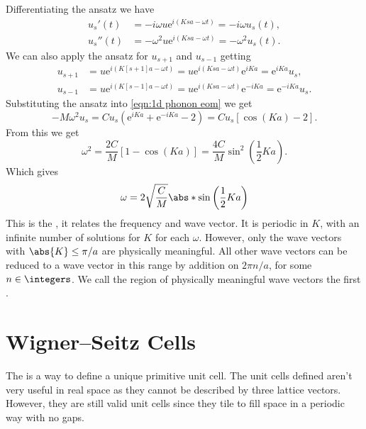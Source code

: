 \documentclass[fleqn]{NotesClass}
\newcommand*{\e}{\mathrm{e}}
\begin{document}
    Differentiating the ansatz we have
    \begin{align*}
        u_s'(t) &= -i\omega u\e^{i(Ksa - \omega t)} = -i\omega u_s(t),\\
        u_s''(t) &= -\omega^2u\e^{i(Ksa - \omega t)} = -\omega^2 u_s(t).
    \end{align*}
    We can also apply the ansatz for \(u_{s+1}\) and \(u_{s-1}\) getting
    \begin{align}
        u_{s+1} &= u\e^{i(K[s+1]a - \omega t)} = u\e^{i(Ksa - \omega t)}\e^{iKa} = \e^{iKa}u_s,\\
        u_{s-1} &= u\e^{i(K[s-1]a - \omega t)} = u\e^{i(Ksa - \omega t)}\e^{-iKa} = \e^{-iKa}u_s.
    \end{align}
    Substituting the ansatz into \cref{eqn:1d phonon eom} we get
    \begin{equation}
        -M\omega^2 u_s = Cu_s(\e^{iKa} + \e^{-iKa} - 2) = Cu_s[\cos(Ka) - 2].
    \end{equation}
    From this we get
    \begin{equation}
        \omega^2 = \frac{2C}{M}[1 - \cos(Ka)] = \frac{4C}{M}\sin^2\left( \frac{1}{2}Ka \right).
    \end{equation}
    Which gives
    \begin{equation}
        \omega = 2\sqrt{\frac{C}{M}} \abs*{\sin\left( \frac{1}{2}Ka \right)}
    \end{equation}
    This is the , it relates the frequency and wave vector.
    It is periodic in \(K\), with an infinite number of solutions for \(K\) for each \(\omega\).
    However, only the wave vectors with \(\abs{K} \le \pi/a\) are physically meaningful.
    All other wave vectors can be reduced to a wave vector in this range by addition on \(2\pi n/a\), for some \(n \in \integers\).
    We call the region of physically meaningful wave vectors the first .
    
    \section{Wigner--Seitz Cells}\label{sec:wigner-seitz cells}
    The  is a way to define a unique primitive unit cell.
    The unit cells defined aren't very useful in real space as they cannot be described by three lattice vectors.
    However, they are still valid unit cells since they tile to fill space in a periodic way with no gaps.
    
\end{document}
